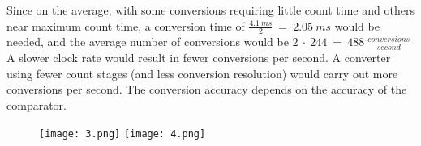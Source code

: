 Since on the average, with some conversions requiring little count time and others near maximum count time, a conversion time of $\frac{4.1\ ms}{2}\ =\ 2.05\ ms$ would be needed, and the average number of conversions would be $2\ \cdot\ 244\ =\ 488\ \frac{conversions}{second}$ A slower clock rate would result in fewer conversions per second. A converter using fewer count stages (and less conversion resolution) would carry out more conversions per second. The conversion accuracy depends on the accuracy of the comparator. \hfill \break

\begin{figure}[H]
\texttt{[image: 3.png]}
\texttt{[image: 4.png]}
\centering \linebreak {}
\end{figure}
